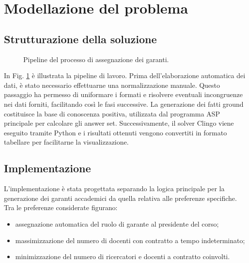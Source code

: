 \section{Modellazione del problema}

\subsection{Strutturazione della soluzione}

\begin{figure}[ht]
\centering
{}
\caption{Pipeline del processo di assegnazione dei garanti.}
\label{fig:pipeline}
\end{figure}

In Fig. \ref{fig:pipeline}
è illustrata la
pipeline di lavoro. Prima dell'elaborazione automatica dei dati, è stato
necessario effettuarne una normalizzazione manuale. Questo passaggio ha permesso
di uniformare i formati e risolvere eventuali incongruenze nei dati forniti,
facilitando così le fasi successive. La generazione dei fatti ground costituisce
la base di conoscenza positiva, utilizzata dal programma ASP principale per
calcolare gli answer set. Successivamente, il solver Clingo viene eseguito
tramite Python e i risultati ottenuti vengono convertiti in formato tabellare
per facilitarne la visualizzazione.

\subsection{Implementazione} \label{implementazione}

L'implementazione è stata progettata separando la logica principale per la
generazione dei garanti accademici da quella relativa alle preferenze
specifiche. Tra le preferenze considerate figurano:  
\begin{itemize}
	\item assegnazione automatica del ruolo di garante al presidente del corso;
	\item massimizzazione del numero di docenti con contratto a tempo indeterminato;
	\item minimizzazione del numero di ricercatori e docenti a contratto coinvolti.
\end{itemize}

